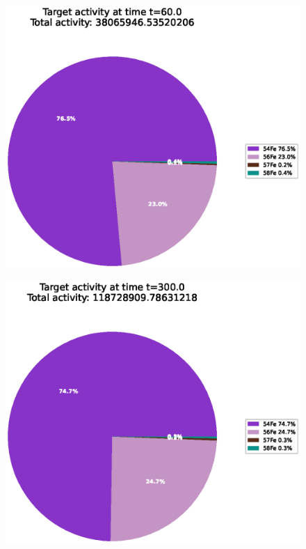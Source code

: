 \begin{figure}[!htb]
\centering
\includegraphics[width=0.8\linewidth]{chapters/results_activity_code/fe-activity-v2/target-activity/0020_60.eps}
\caption{}
\label{fig:activity-v2-target-activity-60s}
\end{figure}

\begin{figure}[!htb]
\centering
\includegraphics[width=0.8\linewidth]{chapters/results_activity_code/fe-activity-v2/target-activity/0100_300.eps}
\caption{}
\label{fig:activity-v2-target-activity-300s}
\end{figure}

